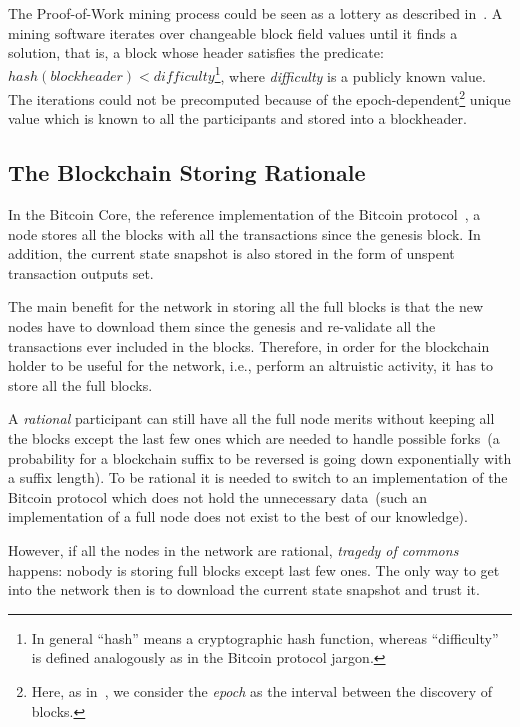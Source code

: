 \documentclass[conference,compsoc]{IEEEtran}
\begin{document}
The Proof-of-Work mining process could be seen as a lottery as described in~\cite{miller2014permacoin}. A mining software iterates over changeable block field values until it finds a solution, that is, a block whose header satisfies the predicate: \( hash(blockheader) < difficulty \)\footnote{In general ``hash'' means a cryptographic hash function, whereas ``difficulty'' is defined analogously as in the Bitcoin protocol jargon.}, where \textit{difficulty} is a publicly known value. The iterations could not be precomputed because of the epoch-dependent\footnote{Here, as in~\cite{miller2014permacoin}, we consider the {\it epoch} as the interval between the discovery of blocks.} unique value which is known to all the participants and stored into a blockheader. 

\subsection{The Blockchain Storing Rationale}
\label{rationale}

In the Bitcoin Core, the reference implementation of the Bitcoin protocol~\cite{bitcoind}, a node stores all the blocks with all the transactions since the genesis block. In addition, the current state snapshot is also stored in the form of unspent transaction outputs set. 

The main benefit for the network in storing all the full blocks is that the new nodes have to download them since the genesis and re-validate all the transactions ever included in the blocks. Therefore, in order for the blockchain holder to be useful for the network, i.e., perform an  altruistic activity, it has to  store all the full blocks. 

A \textit{rational} participant can still have all the full node merits without  keeping all the blocks except the last few ones which are needed to handle possible forks~(a probability for a blockchain suffix to be reversed is going down exponentially with a suffix length). To be rational it is needed to switch to an implementation of the Bitcoin protocol which does not hold the unnecessary data~(such an implementation of a full node does not exist to the best of our knowledge). 

However, if all the nodes in the network are rational, \textit{tragedy of commons}~\cite{hardin1968commons} happens: nobody is storing full blocks except last few ones. The only way to get into the network then is to download the current state snapshot and trust it. 
\end{document}

